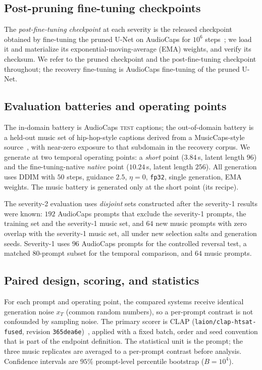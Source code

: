 \documentclass[conference]{IEEEtran}
\begin{document}
\subsection{Post-pruning fine-tuning checkpoints}
The \emph{post-fine-tuning checkpoint} at each severity is the released checkpoint obtained
by fine-tuning the pruned U-Net on AudioCaps for $10^{6}$ steps~\cite{singh2026pruning}; we
load it and materialize its exponential-moving-average (EMA) weights, and verify its
checksum. We refer to the pruned checkpoint and the post-fine-tuning checkpoint throughout;
the recovery fine-tuning is AudioCaps fine-tuning of the pruned U-Net.

\subsection{Evaluation batteries and operating points}
The in-domain battery is AudioCaps \textsc{test} captions; the out-of-domain battery is a
held-out music set of hip-hop-style captions derived from a MusicCaps-style
source~\cite{agostinelli2023musiclm}, with near-zero exposure to that subdomain in the
recovery corpus. We generate at two temporal operating points: a \emph{short} point
($3.84$\,s, latent length $96$) and the fine-tuning-native \emph{native} point ($10.24$\,s,
latent length $256$). All generation uses DDIM with $50$ steps, guidance $2.5$, $\eta=0$,
\texttt{fp32}, single generation, EMA weights. The music battery is generated only at the
short point (its recipe).

The severity-2 evaluation uses \emph{disjoint} sets constructed after the severity-1
results were known: $192$ AudioCaps prompts that exclude the severity-1 prompts, the
training set and the severity-1 music set, and $64$ new music prompts with zero overlap with
the severity-1 music set, all under new selection salts and generation seeds. Severity-1
uses $96$ AudioCaps prompts for the controlled reversal test, a matched $80$-prompt subset
for the temporal comparison, and $64$ music prompts.

\subsection{Paired design, scoring, and statistics}
For each prompt and operating point, the compared systems receive identical generation
noise $x_T$ (common random numbers), so a per-prompt contrast is not confounded by sampling
noise. The primary scorer is CLAP (\texttt{laion/clap-htsat-fused}, revision
\texttt{365dea6e})~\cite{wu2023clap}, applied with a fixed batch, order and seed convention
that is part of the endpoint definition. The statistical unit is the prompt; the three
music replicates are averaged to a per-prompt contrast before analysis. Confidence
intervals are $95\%$ prompt-level percentile bootstrap ($B=10^{4}$).
\end{document}
